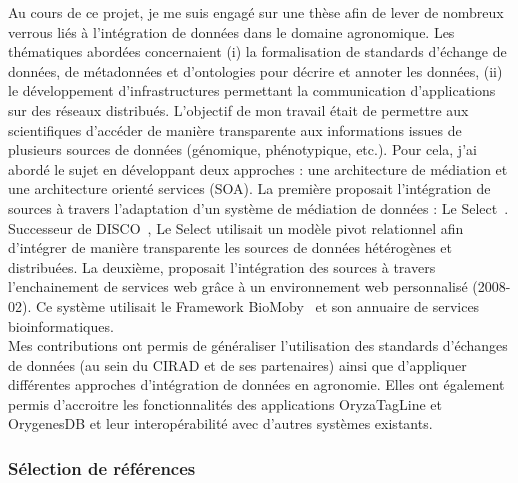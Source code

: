 Au cours de ce projet, je me suis engagé sur une thèse afin de lever de nombreux verrous liés à l’intégration de données dans le domaine agronomique. Les thématiques abordées concernaient (i) la formalisation de standards d’échange de données, de métadonnées et d’ontologies pour décrire et annoter les données, (ii) le développement d’infrastructures permettant la communication d’applications sur des réseaux distribués. L’objectif de mon travail était de permettre aux scientifiques d'accéder de manière transparente aux informations issues de plusieurs sources de données (génomique, phénotypique, etc.).  Pour cela, j’ai abordé le sujet en développant deux approches : une architecture de médiation et une architecture orienté services (SOA).  La première proposait l’intégration de sources à travers l'adaptation d'un système de médiation de données : Le Select~\cite{manolescu2002}. Successeur de DISCO~\cite{Tomasic1998}, Le Select utilisait un modèle pivot relationnel afin d’intégrer de manière transparente les sources de données hétérogènes et distribuées. La deuxième, proposait l’intégration des sources à travers l’enchainement de services web grâce à un environnement web personnalisé (2008-02). Ce système utilisait le Framework BioMoby~\cite{Wilkinson2002a,Wilkinson2005a}  et son annuaire de services bioinformatiques. \\

Mes contributions ont permis de généraliser l’utilisation des standards d’échanges de données (au sein du CIRAD et de ses partenaires) ainsi que d’appliquer différentes approches d’intégration de données en agronomie. Elles ont également permis d’accroitre les fonctionnalités des applications OryzaTagLine et OrygenesDB et leur interopérabilité avec d’autres systèmes existants.

\subsubsection*{Sélection de références}

